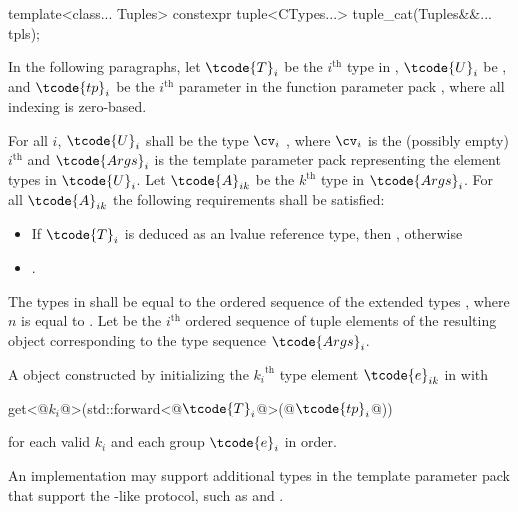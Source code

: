\begin{itemdecl}
template<class... Tuples>
  constexpr tuple<CTypes...> tuple_cat(Tuples&&... tpls);
\end{itemdecl}

\begin{itemdescr}
\pnum
In the following paragraphs, let $\tcode{T}_i$ be the $i^\text{th}$ type in ,
$\tcode{U}_i$ be , and $\tcode{tp}_i$ be the $i^\text{th}$
parameter in the function parameter pack , where all indexing is
zero-based.

\pnum
\requires For all $i$, $\tcode{U}_i$ shall be the type
$\cv_i$ , where $\cv_i$ is the (possibly empty) $i^\text{th}$
 and $\tcode{Args}_i$ is the template parameter pack representing the element
types in $\tcode{U}_i$. Let $\tcode{A}_{ik}$ be the ${k}^\text{th}$ type in $\tcode{Args}_i$. For all
$\tcode{A}_{ik}$ the following requirements shall be satisfied:
\begin{itemize}
\item If $\tcode{T}_i$ is deduced as an lvalue reference type, then
      , otherwise
\item {}.
\end{itemize}

\pnum
\remarks The types in  shall be equal to the ordered
sequence of the extended types
,
where $n$ is
equal to . Let  be the $i^\text{th}$
ordered sequence of tuple elements of the resulting  object
corresponding to the type sequence $\tcode{Args}_i$.

\pnum
\returns A  object constructed by initializing the ${k_i}^\text{th}$
type element $\tcode{e}_{ik}$ in  with
\begin{codeblock}
get<@$k_i$@>(std::forward<@$\tcode{T}_i$@>(@$\tcode{tp}_i$@))
\end{codeblock}
for each valid $k_i$ and each group $\tcode{e}_i$ in order.

\pnum
\begin{note}
An implementation may support additional types in the template parameter
pack  that support the -like protocol, such as
 and .
\end{note}
\end{itemdescr}

